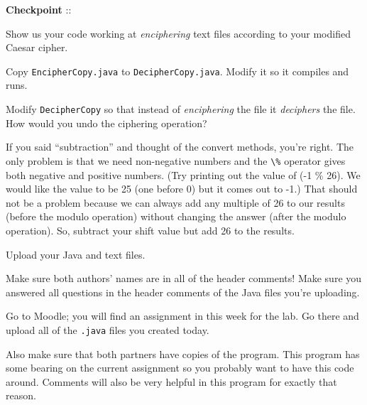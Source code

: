 \documentclass[12pt,oneside]{memoir}
\newcommand\code[1]{\lstinline^#1^}
\newcommand\fname[1]{\texttt{#1}}
\newcounter{LabPhase}
\newenvironment{LabExercises}{%
\renewcommand{\ExerciseListName}{Question}%
\renewcommand{\ExerciseListHeader}{\textbf{%
   Phase\ExerciseHeaderNB. }}
\begin{ExerciseList}}%
{\end{ExerciseList}}
\newcommand{\LabExercise}{\Exercise[name={Lab Phase\ExerciseHeaderNB},counter={LabPhase}]}
\newcounter{CheckPoint}
\newcommand{\Checkpoint}{\textbf{Checkpoint \theCheckPoint }:: \addtocounter{CheckPoint}{1}}
\newcounter{myQuestion}
\begin{document}
\begin{LabExercises}
  \Checkpoint Show us your code working at \emph{enciphering} text
  files according to your modified Caesar cipher. 

  \LabExercise Copy \fname{EncipherCopy.java} to
  \fname{DecipherCopy.java}. Modify it so it compiles and runs.

  \LabExercise Modify \code{DecipherCopy} so that instead of
  \emph{enciphering} the file it \emph{deciphers} the file. How
  would you undo the ciphering operation?

  If you said ``subtraction'' and thought of the convert methods,
  you're right. The only problem is that we need non-negative numbers
  and the \code{\%} operator gives both negative and positive
  numbers. (Try printing out the value of (-1 \% 26). We would like the
  value to be 25 (one before 0) but it comes out to -1.) That should
  not be a problem because we can always add any multiple of 26 to our
  results (before the modulo operation) without changing the answer
  (after the modulo operation). So, subtract your shift value but add
  26 to the results.

  \LabExercise Upload your Java and text files.

  Make sure both authors' names are in all of the header comments!
  Make sure you answered all \themyQuestion {} questions in the header
  comments of the Java files you're uploading.

  Go to Moodle; you will find an assignment in this week for the
  lab. Go there and upload all of the \fname{.java} files you created
  today.

  Also make sure that both partners have copies of the program. This
  program has some bearing on the current assignment so you probably
  want to have this code around. Comments will also be very helpful in
  this program for exactly that reason.
\end{LabExercises}
\end{document}
